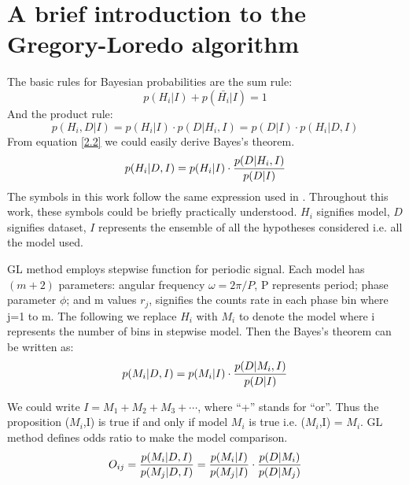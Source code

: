 \documentclass[twoside,twocolumn]{aastex63}
\begin{document}
\newpage
\appendix
\section{A brief introduction to the Gregory-Loredo algorithm}\label{GL}
The basic rules for Bayesian probabilities are the sum rule:
\begin{equation}
p(H_i|I)+p(\bar{H_i}|I)	=1
\end{equation}
\indent
And the product rule:
\begin{equation}\label{2.2}
p(H_i,D|I)=p(H_i|I)\cdot p(D|H_i,I)=p(D|I)\cdot p(H_i|D,I)
\end{equation}
\indent
From equation \ref{2.2} we could easily derive Bayes's theorem.
\begin{equation}\label{2.5} 
p(H_i|D,I)=p(H_i|I)\cdot {p(D|H_i,I)\over p(D|I)}
\end{equation}
\indent
The symbols in this work follow the same expression used in \citep{1992ApJ...398..146G}. Throughout this work, these symbols could be briefly practically understood. $H_i$ signifies model, $D$ signifies dataset, $I$ represents the ensemble of all the hypotheses considered i.e. all the model used.

 GL method employs stepwise function for periodic signal. Each model has $(m+2)$ parameters: angular frequency $\omega={2\pi/P}$, P represents period; phase parameter $\phi$; and m values $r_j$, signifies the counts rate in each phase bin where j=1 to m. The following we replace $H_i$ with $M_i$ to denote the model where i represents the number of bins in stepwise model. Then the Bayes's theorem can be written as:
 \begin{equation}\label{2.11}
 p(M_i|D,I)=p(M_i|I)\cdot {p(D|M_i,I)\over p(D|I)}
 \end{equation}
 
We could write $I=M_1+M_2+M_3+\cdots$, where ``+'' stands for ``or''. Thus the proposition ($M_i$,I) is true if and only if model $M_i$ is true i.e. ($M_i$,I) = $M_i$. GL method defines odds ratio to make the model comparison.
\begin{equation}\label{2.12}
O_{ij}={p(M_i|D,I)\over p(M_j|D,I)}={p(M_i|I)\over p(M_j|I)}\cdot {p(D|M_i)\over p(D|M_j)}
\end{equation}
\end{document}
